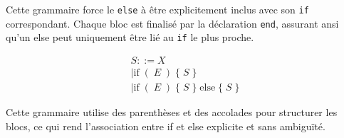 \documentclass{report}
\begin{document}
\begin{multicols*}{3}
Cette grammaire force le \texttt{else} à être explicitement inclus avec son \texttt{if} 
correspondant. Chaque bloc est finalisé par la déclaration \texttt{end}, assurant ansi qu'un 
else peut uniquement être lié au \texttt{if}   le plus proche.

\begin{align*}
 S ::= X \\
    \mid \text{if} \; ( \; E \; ) \; \{ \; S \; \} \\
    \mid \text{if} \; ( \; E \; ) \; \{ \; S \; \} \; \text{else} \; \{ \; S \; \}
\end{align*}

Cette grammaire utilise des parenthèses et des accolades pour structurer les blocs, ce qui rend 
l'association entre if et else explicite et sans ambiguïté.






\end{multicols*}
\end{document}
